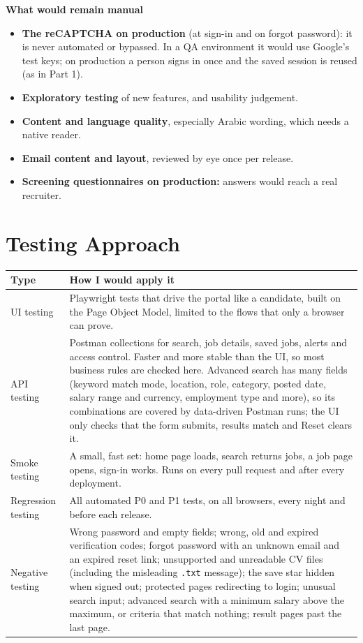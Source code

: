 \documentclass[11pt,a4paper]{article}
\begin{document}
\textbf{What would remain manual}
\begin{itemize}
  \item \textbf{The reCAPTCHA on production} (at sign-in and on forgot password): it is never automated or bypassed. In a QA environment it would use
        Google's test keys; on production a person signs in once and the saved session is reused (as in Part 1).
  \item \textbf{Exploratory testing} of new features, and usability judgement.
  \item \textbf{Content and language quality}, especially Arabic wording, which needs a native reader.
  \item \textbf{Email content and layout}, reviewed by eye once per release.
  \item \textbf{Screening questionnaires on production:} answers would reach a real recruiter.
\end{itemize}

\section{Testing Approach}

\begin{tabularx}{\linewidth}{@{}L{2.7cm}Y@{}}
\toprule
\textbf{Type} & \textbf{How I would apply it} \\
\midrule
UI testing & Playwright tests that drive the portal like a candidate, built on the Page Object Model, limited to the
flows that only a browser can prove. \\
API testing & Postman collections for search, job details, saved jobs, alerts and access control. Faster and more
stable than the UI, so most business rules are checked here. Advanced search has many fields (keyword match mode,
location, role, category, posted date, salary range and currency, employment type and more), so its combinations
are covered by data-driven Postman runs; the UI only checks that the form submits, results match and Reset clears it. \\
Smoke testing & A small, fast set: home page loads, search returns jobs, a job page opens, sign-in works. Runs on
every pull request and after every deployment. \\
Regression testing & All automated P0 and P1 tests, on all browsers, every night and before each release. \\
Negative testing & Wrong password and empty fields; wrong, old and expired verification codes; forgot password
with an unknown email and an expired reset link; unsupported and unreadable CV files (including the misleading
\texttt{.txt} message); the save star hidden when signed out; protected pages redirecting to login; unusual search
input; advanced search with a minimum salary above the maximum, or criteria that match nothing; result pages past
the last page. \\
\bottomrule
\end{tabularx}
\end{document}

